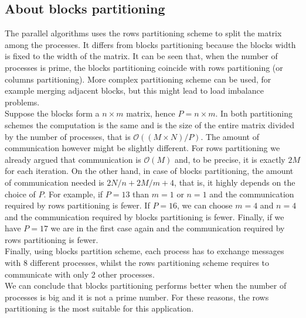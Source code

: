 \documentclass{article}
\begin{document}
\subsection{About blocks partitioning} \label{sec:blockpartitioning}
The parallel algorithms uses the rows partitioning scheme to split the matrix among the processes. It differs from blocks partitioning because the blocks width is fixed to the width of the matrix. It can be seen that, when the number of processes is prime, the blocks partitioning coincide with rows partitioning (or columns partitioning). More complex partitioning scheme can be used, for example merging adjacent blocks, but this might lead to load imbalance problems. \\
Suppose the blocks form a $n \times m$ matrix, hence $P = n \times m$. In both partitioning schemes the computation is the same and is the size of the entire matrix divided by the number of processes, that is $\mathcal{O}((M \times N) / P)$. The amount of communication however might be slightly different. For rows partitioning we already argued that communication is $\mathcal{O}(M)$ and, to be precise, it is exactly $2M$ for each iteration. On the other hand, in case of blocks partitioning, the amount of communication needed is $2N/n + 2M/m + 4$, that is, it highly depends on the choice of $P$. For example, if $P = 13$ than $m = 1$ or $n = 1$ and the communication required by rows partitioning is fewer. If $P = 16$, we can choose $m = 4$ and $n = 4$ and the communication required by blocks partitioning is fewer. Finally, if we have $P = 17$ we are in the first case again and the communication required by rows partitioning is fewer. \\
Finally, using blocks partition scheme, each process has to exchange messages with 8 different processes, whilst the rows partitioning scheme requires to communicate with only 2 other processes. \\
We can conclude that blocks partitioning performs better when the number of processes is big and it is not a prime number. For these reasons, the rows partitioning is the most suitable for this application.
\end{document}
